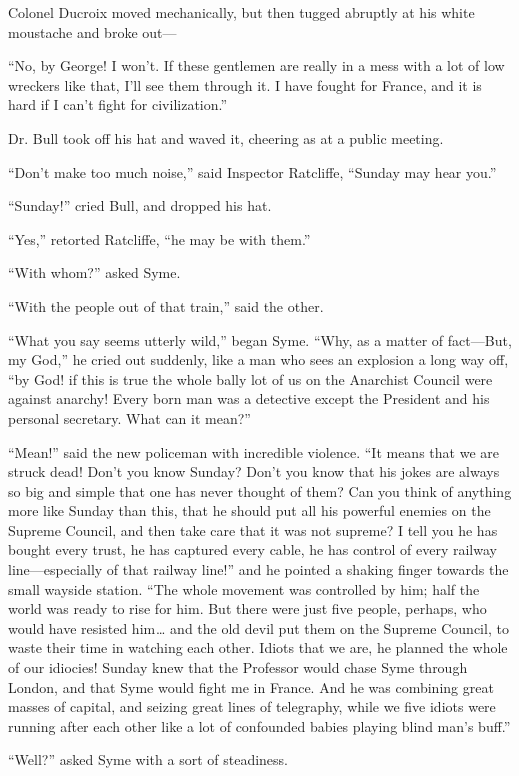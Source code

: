 Colonel Ducroix moved mechanically, but then tugged abruptly at his white moustache and broke out⁠—

“No, by George! I won’t. If these gentlemen are really in a mess with a lot of low wreckers like that, I’ll see them through it. I have fought for France, and it is hard if I can’t fight for civilization.”

Dr. Bull took off his hat and waved it, cheering as at a public meeting.

“Don’t make too much noise,” said Inspector Ratcliffe, “Sunday may hear you.”

“Sunday!” cried Bull, and dropped his hat.

“Yes,” retorted Ratcliffe, “he may be with them.”

“With whom?” asked Syme.

“With the people out of that train,” said the other.

“What you say seems utterly wild,” began Syme. “Why, as a matter of fact⁠—But, my God,” he cried out suddenly, like a man who sees an explosion a long way off, “by God! if this is true the whole bally lot of us on the Anarchist Council were against anarchy! Every born man was a detective except the President and his personal secretary. What can it mean?”

“Mean!” said the new policeman with incredible violence. “It means that we are struck dead! Don’t you know Sunday? Don’t you know that his jokes are always so big and simple that one has never thought of them? Can you think of anything more like Sunday than this, that he should put all his powerful enemies on the Supreme Council, and then take care that it was not supreme? I tell you he has bought every trust, he has captured every cable, he has control of every railway line⁠—especially of that railway line!” and he pointed a shaking finger towards the small wayside station. “The whole movement was controlled by him; half the world was ready to rise for him. But there were just five people, perhaps, who would have resisted him⁠ ⁠… and the old devil put them on the Supreme Council, to waste their time in watching each other. Idiots that we are, he planned the whole of our idiocies! Sunday knew that the Professor would chase Syme through London, and that Syme would fight me in France. And he was combining great masses of capital, and seizing great lines of telegraphy, while we five idiots were running after each other like a lot of confounded babies playing blind man’s buff.”

“Well?” asked Syme with a sort of steadiness.

